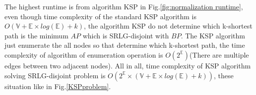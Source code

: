 The highest runtime is from algorithm KSP in Fig.\ref{fig:normalization runtime}, even though time complexity of the standard KSP algorithm is $O(\mathbb{V}+\mathbb{E}\times log(\mathbb{E})+k)$\cite{eppstein1998finding}, the algorithm KSP do not determine which k-shortest path is the minimum $AP$ which is SRLG-disjoint with $BP$.
The KSP algorithm just enumerate the all nodes so that determine which k-shortest path, the time complexity of algorithm of enumeration operation is $O(2^\mathbb{E})$(There are multiple edges between two adjacent nodes). All in all, time complexity of KSP algorithm solving SRLG-disjoint problem is $O(2^\mathbb{E}\times (\mathbb{V}+\mathbb{E}\times log(\mathbb{E})+k))$, these situation like in Fig.\ref{KSPproblem}.







